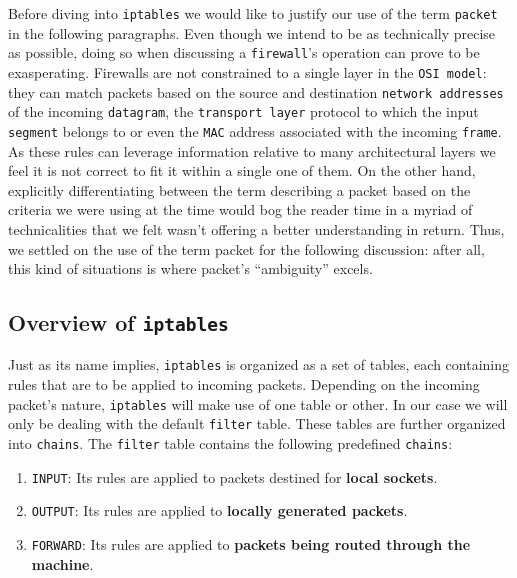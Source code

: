         Before diving into \texttt{iptables} we would like to justify our use of the term \texttt{packet} in the following paragraphs. Even though we intend to be as technically precise as possible, doing so when discussing a \texttt{firewall}'s operation can prove to be exasperating. Firewalls are not constrained to a single layer in the \texttt{OSI model}: they can match packets based on the source and destination \texttt{network addresses} of the incoming \texttt{datagram}, the \texttt{transport layer} protocol to which the input \texttt{segment} belongs to or even the \texttt{MAC} address associated with the incoming \texttt{frame}. As these rules can leverage information relative to many architectural layers we feel it is not correct to fit it within a single one of them. On the other hand, explicitly differentiating between the term describing a packet based on the criteria we were using at the time would bog the reader time in a myriad of technicalities that we felt wasn't offering a better understanding in return. Thus, we settled on the use of the term packet for the following discussion: after all, this kind of situations is where packet's ``ambiguity'' excels.\\

        \subsection{Overview of \texttt{iptables}}
            Just as its name implies, \texttt{iptables} is organized as a set of tables, each containing rules that are to be applied to incoming packets. Depending on the incoming packet's nature, \texttt{iptables} will make use of one table or other. In our case we will only be dealing with the default \texttt{filter} table. These tables are further organized into \texttt{chains}. The \texttt{filter} table contains the following predefined \texttt{chains}:\\

            \begin{enumerate}
                \item \texttt{INPUT}: Its rules are applied to packets destined for \textbf{local sockets}.
                \item \texttt{OUTPUT}: Its rules are applied to \textbf{locally generated packets}.
                \item \texttt{FORWARD}: Its rules are applied to \textbf{packets being routed through the machine}.
            \end{enumerate}

